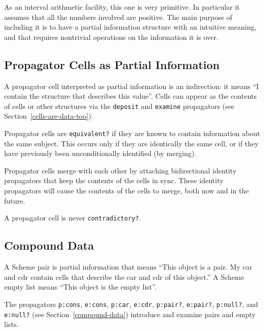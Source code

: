 \documentclass[12pt,letterpaper,english]{article}
\begin{document}
As an interval arithmetic facility, this one is very primitive.  In
particular it assumes that all the numbers involved are positive.  The
main purpose of including it is to have a partial information
structure with an intuitive meaning, and that requires nontrivial
operations on the information it is over.



\hypertarget{propagator-cells-as-partial-information}{}
\subsection{Propagator Cells as Partial Information}
\label{propagator-cells-as-partial-information}

A propagator cell interpreted as partial information is an
indirection: it means ``I contain the structure that describes this
value''.  Cells can appear as the contents of cells or other structures
via the \texttt{deposit} and \texttt{examine} propagators
(see Section~\ref{cells-are-data-too}).

Propagator cells are \texttt{equivalent?} if they are known to contain
information about the same subject.  This occurs only if they are
identically the same cell, or if they have previously been
unconditionally identified (by merging).

Propagator cells merge with each other by attaching bidirectional
identity propagators that keep the contents of the cells in sync.
These identity propagators will cause the contents of the cells to
merge, both now and in the future.

A propagator cell is never \texttt{contradictory?}.



\hypertarget{id1}{}
\subsection{Compound Data}
\label{id1}

A Scheme pair is partial information that means ``This object is a
pair.  My car and cdr contain cells that describe the car and cdr of
this object.''  A Scheme empty list means ``This object is the empty
list''.

The propagators \texttt{p:cons}, \texttt{e:cons}, \texttt{p:car}, \texttt{e:cdr},
\texttt{p:pair?}, \texttt{e:pair?}, \texttt{p:null?}, and \texttt{e:null?}
(see Section~\ref{compound-data})
introduce and examine pairs and empty lists.
\end{document}
